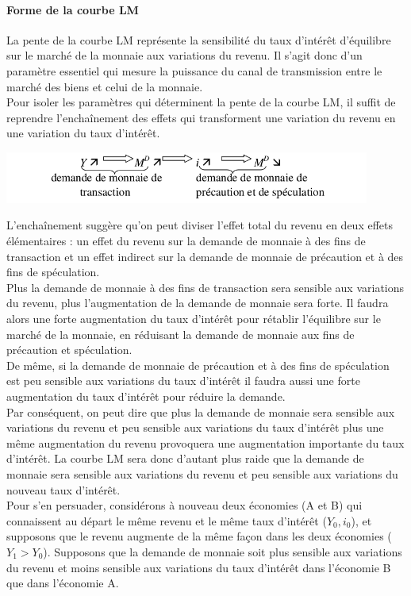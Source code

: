 \documentclass[10pt]{book}
\begin{document}
\paragraph{Forme de la courbe LM}
La pente de la courbe LM représente la sensibilité du taux d'intérêt d'équilibre sur le marché de la monnaie aux variations du revenu. Il s'agit donc d'un paramètre essentiel qui mesure la puissance du canal de transmission entre le marché des biens et celui de la monnaie. \\
Pour isoler les paramètres qui déterminent la pente de la courbe LM, il suffit de reprendre l'enchaînement des effets qui transforment une variation du revenu en une variation du taux d'intérêt.
\begin{center}
  \includegraphics[width=12cm]{graph28.png}
\end{center}
L'enchaînement suggère qu'on peut diviser l'effet total du revenu en deux effets élémentaires : un effet du revenu sur la demande de monnaie à des fins de transaction et un effet indirect sur la demande de monnaie de précaution et à des fins de spéculation. \\
Plus la demande de monnaie à des fins de transaction sera sensible aux variations du revenu, plus l'augmentation de la demande de monnaie sera forte. Il faudra alors une forte augmentation du taux d'intérêt pour rétablir l'équilibre sur le marché de la monnaie, en réduisant la demande de monnaie aux fins de précaution et spéculation. \\
De même, si la demande de monnaie de précaution et à des fins de spéculation est peu sensible aux variations du taux d'intérêt il faudra aussi une forte augmentation du taux d'intérêt pour réduire la demande. \\
Par conséquent, on peut dire que plus la demande de monnaie sera sensible aux variations du revenu et peu sensible aux variations du taux d'intérêt plus une même augmentation du revenu provoquera une augmentation importante du taux d'intérêt. La courbe LM sera donc d'autant plus raide que la demande de monnaie sera sensible aux variations du revenu et peu sensible aux variations du nouveau taux d'intérêt. \\
Pour s'en persuader, considérons à nouveau deux économies (A et B) qui connaissent au départ le même revenu et le même taux d'intérêt ($Y_0,i_0$), et supposons que le revenu augmente de la même façon dans les deux économies ($Y_1 > Y_0$). Supposons que la demande de monnaie soit plus sensible aux variations du revenu et moins sensible aux variations du taux d'intérêt dans l'économie B que dans l'économie A.
\end{document}
